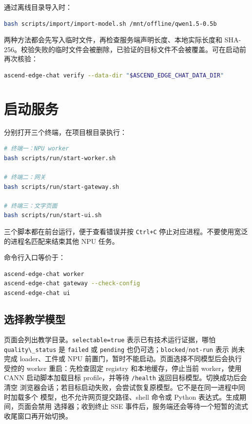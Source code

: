 通过离线目录导入时：

\begin{lstlisting}[language=bash]
bash scripts/import/import-model.sh /mnt/offline/qwen1.5-0.5b
\end{lstlisting}

两种方法都会先写入临时文件，再检查服务端声明长度、本地实际长度和
SHA-256。校验失败的临时文件会被删除，已验证的目标文件不会被覆盖。可在启动前再次核验：

\begin{lstlisting}[language=bash]
ascend-edge-chat verify --data-dir "$ASCEND_EDGE_CHAT_DATA_DIR"
\end{lstlisting}

\section{启动服务}\label{ux542fux52a8ux670dux52a1}

分别打开三个终端，在项目根目录执行：

\begin{lstlisting}[language=bash]
# 终端一：NPU worker
bash scripts/run/start-worker.sh

# 终端二：网关
bash scripts/run/start-gateway.sh

# 终端三：文字页面
bash scripts/run/start-ui.sh
\end{lstlisting}

三个脚本都在前台运行，便于查看错误并按 \passthrough{\lstinline!Ctrl+C!}
停止对应进程。不要使用宽泛的进程名匹配来结束其他 NPU 任务。

命令行入口等价于：

\begin{lstlisting}[language=bash]
ascend-edge-chat worker
ascend-edge-chat gateway --check-config
ascend-edge-chat ui
\end{lstlisting}

\subsection{选择教学模型}\label{ux9009ux62e9ux6559ux5b66ux6a21ux578b}

页面会列出教学目录。\passthrough{\lstinline!selectable=true!}
表示已有技术运行证据，哪怕 \passthrough{\lstinline!quality\_status!} 是
\passthrough{\lstinline!failed!} 或 \passthrough{\lstinline!pending!}
也仍可选；\passthrough{\lstinline!blocked!}/\passthrough{\lstinline!not-run!}
表示 尚未完成 loader、工件或 NPU
前置门，暂时不能启动。页面选择不同模型后会执行 受控的 worker
重启：先检查固定 registry 和本地缓存，停止当前 worker，使用 CANN
启动脚本加载目标 profile，并等待 \passthrough{\lstinline!/health!}
返回目标模型。切换成功后会清空
浏览器会话；若目标启动失败，会尝试恢复原模型。它不是在同一进程中同时加载多个
模型，也不允许网页提交路径、shell 命令或 Python
表达式。生成期间，页面会禁用 选择器；收到终止 SSE
事件后，服务端还会等待一个短暂的流式收尾窗口再开始切换。

